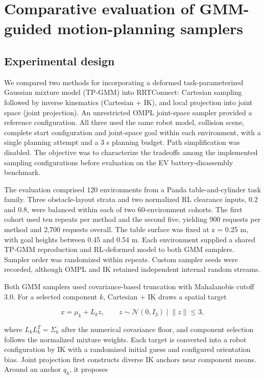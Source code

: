 \hypertarget{comparative-evaluation-of-gmm-guided-motion-planning-samplers}{%
\section{Comparative evaluation of GMM-guided motion-planning samplers}\label{comparative-evaluation-of-gmm-guided-motion-planning-samplers}}

\hypertarget{experimental-design}{%
\subsection{Experimental design}\label{experimental-design}}

We compared two methods for incorporating a deformed task-parameterized Gaussian mixture model (TP-GMM) into RRTConnect: Cartesian sampling followed by inverse kinematics (Cartesian + IK), and local projection into joint space (joint projection). An unrestricted OMPL joint-space sampler provided a reference configuration. All three used the same robot model, collision scene, complete start configuration and joint-space goal within each environment, with a single planning attempt and a 3 s planning budget. Path simplification was disabled. The objective was to characterize the tradeoffs among the implemented sampling configurations before evaluation on the EV battery-disassembly benchmark.

The evaluation comprised 120 environments from a Panda table-and-cylinder task family. Three obstacle-layout strata and two normalized RL clearance inputs, 0.2 and 0.8, were balanced within each of two 60-environment cohorts. The first cohort used ten repeats per method and the second five, yielding 900 requests per method and 2,700 requests overall. The table surface was fixed at z = 0.25 m, with goal heights between 0.45 and 0.54 m. Each environment supplied a shared TP-GMM reproduction and RL-deformed model to both GMM samplers. Sampler order was randomized within repeats. Custom sampler seeds were recorded, although OMPL and IK retained independent internal random streams.

Both GMM samplers used covariance-based truncation with Mahalanobis cutoff 3.0. For a selected component \(k\), Cartesian + IK draws a spatial target

\[x = \mu_k + L_k z,\qquad z\sim\mathcal{N}(0,I_3)\mid\lVert z\rVert\leq3,\]

where \(L_kL_k^T=\Sigma_k\) after the numerical covariance floor, and component selection follows the normalized mixture weights. Each target is converted into a robot configuration by IK with a randomized initial guess and configured orientation bias. Joint projection first constructs diverse IK anchors near component means. Around an anchor \(q_k\), it proposes

